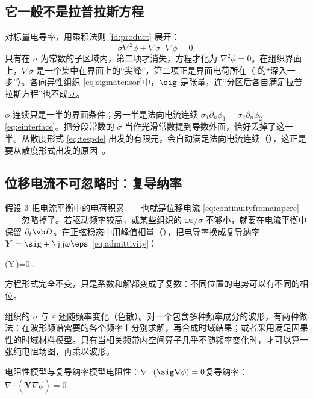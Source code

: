 \subsection{它一般不是拉普拉斯方程}
对标量电导率，用乘积法则 \eqref{id:product} 展开：
\begin{equation}
\sigma\nabla^2\phi+\nabla\sigma\cdot\nabla\phi=0 .
\end{equation}
只有在 $\sigma$ 为常数的子区域内，第二项才消失，方程才化为 $\nabla^2\phi=0$。在组织界面上，$\nabla\sigma$ 是一个集中在界面上的“尖峰”，第二项正是界面电荷所在（ 的“深入一步”）。各向异性组织 \eqref{eq:sigmatensor}中，$\sig$ 是张量，连“分区后各自满足拉普拉斯方程”也不成立。

\begin{pitfall}[“先在每块组织里解 $\nabla^2\phi=0$，界面上让 $\phi$ 连续就行”]
$\phi$ 连续只是一半的界面条件；另一半是法向电流连续 $\sigma_1\partial_n\phi_1=\sigma_2\partial_n\phi_2$ \eqref{eq:einterface}。把分段常数的 $\sigma$ 当作光滑常数提到导数外面，恰好丢掉了这一半。从散度形式 \eqref{eq:tespde} 出发的有限元，会自动满足法向电流连续（），这正是要从散度形式出发的原因~\cite{simnibs}。
\end{pitfall}

\subsection{位移电流不可忽略时：复导纳率}
假设 3 把电流平衡中的电荷积累——也就是位移电流 \eqref{eq:continuityfromampere}——忽略掉了。若驱动频率较高，或某些组织的 $\omega\varepsilon/\sigma$ 不够小，就要在电流平衡中保留 $\partial_t\vb D$。在正弦稳态中用峰值相量（），把电导率换成复导纳率 $\boldsymbol Y=\sig+\jj\omega\eps$ \eqref{eq:admittivity}：
\begin{keyeq}
\nabla\cdot\bigl(\boldsymbol Y\,\nabla\widetilde\phi\bigr)=0 .
\label{eq:tescomplex}
\end{keyeq}
方程形式完全不变，只是系数和解都变成了复数：不同位置的电势可以有不同的相位。

组织的 $\sigma$ 与 $\varepsilon$ 还随频率变化（色散）。对一个包含多种频率成分的波形，有两种做法：在波形频谱需要的各个频率上分别求解，再合成时域结果；或者采用满足因果性的时域材料模型。只有当相关频带内空间算子几乎不随频率变化时，才可以算一张纯电阻场图，再乘以波形。

\begin{compare}{电阻性模型与复导纳率模型}{电阻性：$\nabla\cdot(\sig\nabla\phi)=0$}{复导纳率：$\nabla\cdot(\boldsymbol Y\nabla\widetilde\phi)=0$}
\end{compare}

